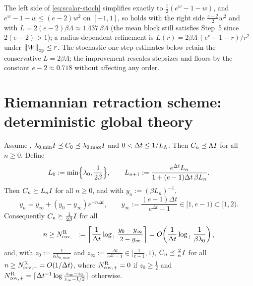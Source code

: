 \begin{remark}
\label{rem:retr-sharp}
The left side of \eqref{eq:scalar-stoch} simplifies exactly to $\tfrac12(e^w-1-w)$, and
$e^w-1-w\leq(e-2)w^2$ on $[-1,1]$, so  holds with the right side
$\tfrac{e-2}2w^2$ and  with $L=2(e-2)\beta\Lambda\approx1.437\,\beta\Lambda$
(the mean block still satisfies Step~5 since $2(e-2)>1$); a radius-dependent refinement is
$L(r)=2\beta\Lambda\,(e^r-1-r)/r^2$ under $\left\lVert W\right\rVert_{\mathrm{op}}\leq r$. The stochastic one-step estimates below
retain the conservative $L=2\beta\Lambda$; the improvement rescales stepsizes and floors by the
constant $e-2\approx0.718$ without affecting any order.
\end{remark}

\section{Riemannian retraction scheme: deterministic global theory}
\label{sec:Riem-global}

\begin{lemma}
\label{lem:Riem-cov}
Assume , $\lambda_{0,\min}I\preceq C_0\preceq\lambda_{0,\max}I$
and $0<\Delta t\leq1/L_\Lambda$. Then $C_n\preceq\Lambda I$ for all $n\geq0$. Define
\begin{equation}
\label{eq:Riem-envelope}
    L_0:=\min\Bigl\{\lambda_0,\frac1{2\beta}\Bigr\},
    \qquad
    L_{n+1}:=\frac{e^{\Delta t}L_n}{1+(e-1)\Delta t\,\beta L_n}.
\end{equation}
Then $C_n\succeq L_nI$ for all $n\geq0$, and with $y_n:=(\beta L_n)^{-1}$,
\begin{equation}
\label{eq:Riem-y}
    y_n=y_\infty+(y_0-y_\infty)e^{-n\Delta t},
    \qquad
    y_\infty:=\frac{(e-1)\Delta t}{e^{\Delta t}-1}\in[1,e-1)\subset[1,2).
\end{equation}
Consequently $C_n\succeq\tfrac1{2\beta}I$ for all
\begin{equation}
\label{eq:Ncov-minus}
    n\geq N_{\mathrm{cov},-}^{\mathrm{R}}
    :=\left\lceil\frac1{\Delta t}\log_+\frac{y_0-y_\infty}{2-y_\infty}\right\rceil
    =O\!\left(\frac1{\Delta t}\log_+\frac1{\beta\lambda_0}\right),
\end{equation}
and, with $z_0:=\tfrac1{\alpha\lambda_{0,\max}}$ and $z_\infty:=\tfrac{\Delta t}{e^{\Delta t}-1}\in[\tfrac1{e-1},1)$,
$C_n\preceq\tfrac2\alpha I$ for all $n\geq N_{\mathrm{cov},+}^{\mathrm{R}}=O(1/\Delta t)$, where
$N_{\mathrm{cov},+}^{\mathrm{R}}=0$ if $z_0\geq\tfrac12$ and
$N_{\mathrm{cov},+}^{\mathrm{R}}=\lceil\Delta t^{-1}\log\tfrac{z_\infty-z_0}{z_\infty-1/2}\rceil$ otherwise.
\end{lemma}

